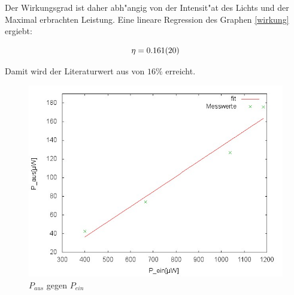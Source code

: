 	Der Wirkungsgrad ist daher abh"angig von der Intensit"at des Lichts und der Maximal erbrachten Leistung.
	Eine lineare Regression des Graphen \eqref{wirkung} ergiebt:

	\begin{equation*}
		\eta = \SI{0.161 (20)}{}
	\end{equation*}

	Damit wird der Literaturwert aus \cite{artikel2} von $16\%$ erreicht.\\

	

	\begin{figure}[htbp]
		\centering
		\includegraphics[width = 12cm]{img/wirkung.jpg}
		\caption{$P_{aus}$ gegen $P_{ein}$}
		\label{wirkung}
	\end{figure}